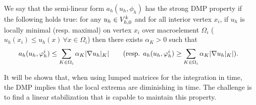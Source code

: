 \begin{definition} \label{strongDMP}
We say that the semi-linear form $a_h(u_h,\phi_h)$ has the strong DMP property if the following holds true: for any $u_h \in V^k_{h,0}$ and for all interior vertex $x_i$, if $u_h$ is locally minimal (resp. maximal) on vertex $x_i$ over macroelement  $\Omega_i$ ($u_h(x_i)\leq u_h(x) \, \forall x\in \Omega_i$) then there exists $\alpha_K> 0$ such that
\begin{equation*}
a_h(u_h,\varphi^i_h) \leq \sum_{K\in \Omega_i} \alpha_K |\nabla u_h |_K | \qquad \hbox{(resp. } a_h(u_h,\varphi^i_h) \geq  \sum_{K\in \Omega_i} \alpha_K |\nabla u_h |_K | \hbox{)}.
\end{equation*}
\end{definition}
It will be shown that, when using lumped matrices for the integration in time, the DMP implies that the local extrema are diminishing in time. The challenge is to find a linear stabilization that is capable to maintain this property. %

